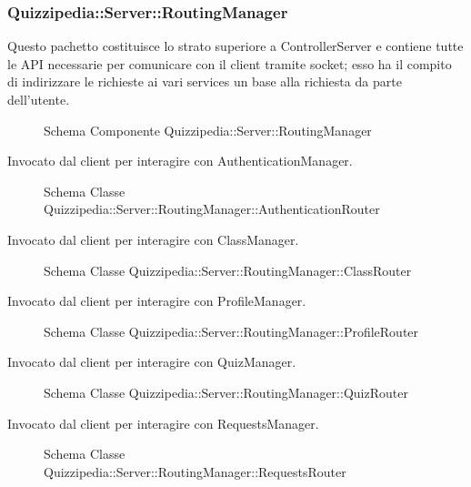 \subsubsection{Quizzipedia::Server::RoutingManager}
Questo pachetto costituisce lo strato superiore a ControllerServer e contiene tutte le API necessarie per comunicare con il client tramite socket; esso ha il compito di indirizzare le richieste ai vari services un base alla richiesta da parte dell'utente.
\begin{figure}[H]
\centering
\noindent{}
\caption{Schema Componente Quizzipedia::Server::RoutingManager}
\end{figure}
Invocato dal client per interagire con AuthenticationManager.
\begin{figure}[H]
\centering
\noindent{}
\caption{Schema Classe Quizzipedia::Server::RoutingManager::AuthenticationRouter}
\end{figure}
Invocato dal client per interagire con ClassManager.
\begin{figure}[H]
\centering
\noindent{}
\caption{Schema Classe Quizzipedia::Server::RoutingManager::ClassRouter}
\end{figure}
Invocato dal client per interagire con ProfileManager.
\begin{figure}[H]
\centering
\noindent{}
\caption{Schema Classe Quizzipedia::Server::RoutingManager::ProfileRouter}
\end{figure}
Invocato dal client per interagire con QuizManager.
\begin{figure}[H]
\centering
\noindent{}
\caption{Schema Classe Quizzipedia::Server::RoutingManager::QuizRouter}
\end{figure}
Invocato dal client per interagire con RequestsManager.
\begin{figure}[H]
\centering
\noindent{}
\caption{Schema Classe Quizzipedia::Server::RoutingManager::RequestsRouter}
\end{figure}
